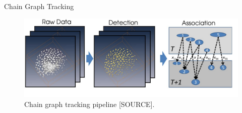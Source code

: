 \begin{frame}{Chain Graph Tracking}
    \begin{figure}
        \centering
        \includegraphics[width=\textwidth]{images/cell_tracking/pipeline.pdf}
        \caption{Chain graph tracking pipeline [SOURCE].}
        \label{fig:chaingraph-pipeline}
    \end{figure}
\end{frame}

